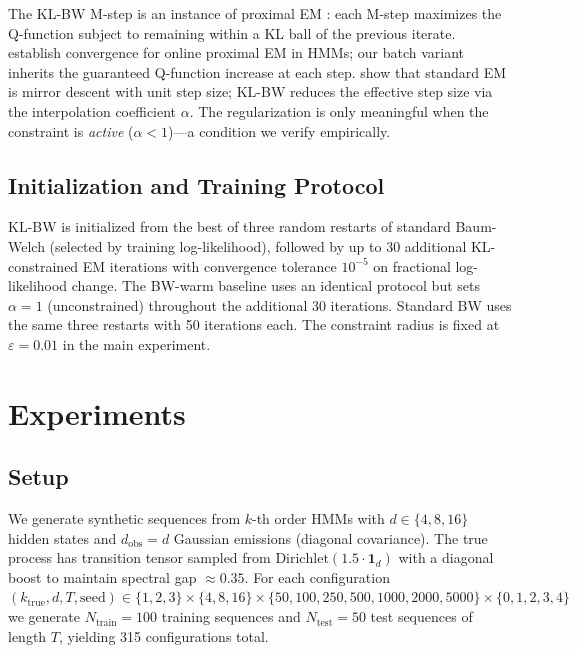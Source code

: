 \documentclass[11pt,letterpaper]{article}
\begin{document}
The KL-BW M-step is an instance of proximal EM \citep{Cappe2009}: each M-step maximizes the Q-function subject to remaining
within a KL ball of the previous iterate. \citet{Cappe2009} establish convergence for online proximal EM in HMMs; our batch
variant inherits the guaranteed Q-function increase at each step. \citet{Kunstner2021} show that standard EM is mirror
descent with unit step size; KL-BW reduces the effective step size via the interpolation coefficient $\alpha$. The
regularization is only meaningful when the constraint is \emph{active} ($\alpha < 1$)---a condition we verify empirically.

\subsection{Initialization and Training Protocol}

KL-BW is initialized from the best of three random restarts of standard Baum-Welch (selected by training log-likelihood),
followed by up to 30 additional KL-constrained EM iterations with convergence tolerance $10^{-5}$ on fractional
log-likelihood change. The BW-warm baseline uses an identical protocol but sets $\alpha=1$ (unconstrained) throughout the
additional 30 iterations. Standard BW uses the same three restarts with 50 iterations each. The constraint radius is fixed
at $\varepsilon=0.01$ in the main experiment.

\section{Experiments}
\label{sec:experiments}

\subsection{Setup}

We generate synthetic sequences from $k$-th order HMMs with $d \in \{4, 8, 16\}$ hidden states and $d_\text{obs}=d$
Gaussian emissions (diagonal covariance). The true process has transition tensor sampled from
$\text{Dirichlet}(1.5 \cdot \mathbf{1}_d)$ with a diagonal boost to maintain spectral gap $\approx 0.35$. For each
configuration $(k_\text{true}, d, T, \text{seed}) \in \{1,2,3\} \times \{4,8,16\} \times \{50, 100, 250, 500, 1000, 2000, 5000\}
\times \{0,1,2,3,4\}$ we generate $N_\text{train}=100$ training sequences and $N_\text{test}=50$ test sequences of length
$T$, yielding 315 configurations total.
\end{document}
